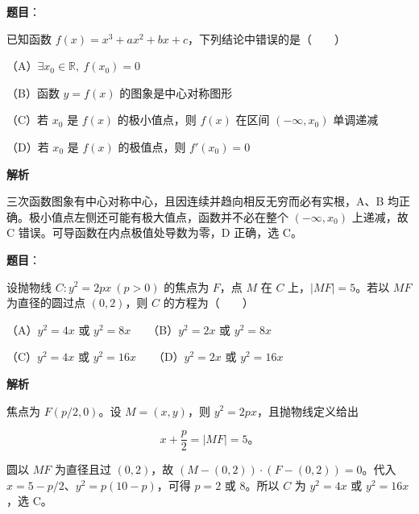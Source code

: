 \begin{answer}

\textbf{题目}：

已知函数 $f(x)=x^3+ax^2+bx+c$，下列结论中错误的是\mbox{（　　）}

（A）$\exists x_0\in\mathbb R,\ f(x_0)=0$

（B）函数 $y=f(x)$ 的图象是中心对称图形

（C）若 $x_0$ 是 $f(x)$ 的极小值点，则 $f(x)$ 在区间 $(-\infty,x_0)$ 单调递减

（D）若 $x_0$ 是 $f(x)$ 的极值点，则 $f'(x_0)=0$

\textbf{解析}

三次函数图象有中心对称中心，且因连续并趋向相反无穷而必有实根，A、B 均正确。极小值点左侧还可能有极大值点，函数并不必在整个 $(-\infty,x_0)$ 上递减，故 C 错误。可导函数在内点极值处导数为零，D 正确，选 C。


\end{answer}
\begin{answer}

\textbf{题目}：

设抛物线 $C:y^2=2px\ (p>0)$ 的焦点为 $F$，点 $M$ 在 $C$ 上，$|MF|=5$。若以 $MF$ 为直径的圆过点 $(0,2)$，则 $C$ 的方程为\mbox{（　　）}

（A）$y^2=4x$ 或 $y^2=8x$　　（B）$y^2=2x$ 或 $y^2=8x$

（C）$y^2=4x$ 或 $y^2=16x$　　（D）$y^2=2x$ 或 $y^2=16x$

\textbf{解析}

焦点为 $F(p/2,0)$。设 $M=(x,y)$，则 $y^2=2px$，且抛物线定义给出

\nopagebreak[4]
\[x+\frac p2=|MF|=5\text{。}\]

圆以 $MF$ 为直径且过 $(0,2)$，故 $(M-(0,2))\cdot(F-(0,2))=0$。代入 $x=5-p/2$、$y^2=p(10-p)$，可得 $p=2$ 或 $8$。所以 $C$ 为 $y^2=4x$ 或 $y^2=16x$，选 C。


\end{answer}
